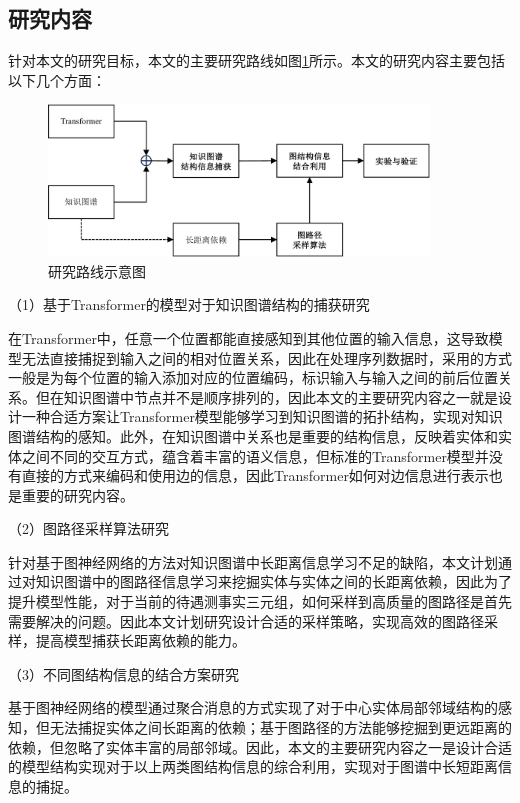 \subsection{研究内容}


针对本文的研究目标，本文的主要研究路线如图\ref{research_route}所示。本文的研究内容主要包括以下几个方面：

\begin{figure}[htb]
  \centerline{\includegraphics[width=0.9\textwidth]{pic/research_route_2.pdf}}
  \caption{研究路线示意图}
  \label{research_route}
\end{figure}

（1）基于Transformer的模型对于知识图谱结构的捕获研究

在Transformer中，任意一个位置都能直接感知到其他位置的输入信息，这导致模型无法直接捕捉到输入之间的相对位置关系，因此在处理序列数据时，采用的方式一般是为每个位置的输入添加对应的位置编码，标识输入与输入之间的前后位置关系。但在知识图谱中节点并不是顺序排列的，因此本文的主要研究内容之一就是设计一种合适方案让Transformer模型能够学习到知识图谱的拓扑结构，实现对知识图谱结构的感知。此外，在知识图谱中关系也是重要的结构信息，反映着实体和实体之间不同的交互方式，蕴含着丰富的语义信息，但标准的Transformer模型并没有直接的方式来编码和使用边的信息，因此Transformer如何对边信息进行表示也是重要的研究内容。

（2）图路径采样算法研究

针对基于图神经网络的方法对知识图谱中长距离信息学习不足的缺陷，本文计划通过对知识图谱中的图路径信息学习来挖掘实体与实体之间的长距离依赖，因此为了提升模型性能，对于当前的待遇测事实三元组，如何采样到高质量的图路径是首先需要解决的问题。因此本文计划研究设计合适的采样策略，实现高效的图路径采样，提高模型捕获长距离依赖的能力。

（3）不同图结构信息的结合方案研究

基于图神经网络的模型通过聚合消息的方式实现了对于中心实体局部邻域结构的感知，但无法捕捉实体之间长距离的依赖；基于图路径的方法能够挖掘到更远距离的依赖，但忽略了实体丰富的局部邻域。因此，本文的主要研究内容之一是设计合适的模型结构实现对于以上两类图结构信息的综合利用，实现对于图谱中长短距离信息的捕捉。

